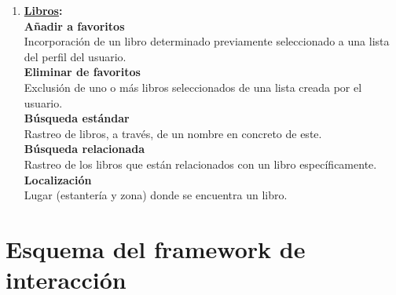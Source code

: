 \documentclass[12pt]{article}
\begin{document}
\begin{enumerate}
\item \textbf{\underline{Libros}:}\\
\textbf{Añadir a favoritos}\\
Incorporación de un libro determinado previamente seleccionado a una lista del perfil del usuario.\\
\textbf{Eliminar de favoritos}\\
Exclusión de uno o más libros seleccionados de una lista creada por el usuario.\\
\textbf{Búsqueda estándar}\\
Rastreo de libros, a través, de un nombre en concreto de este.\\
\textbf{Búsqueda relacionada}\\
Rastreo de los libros que están relacionados con un libro específicamente.\\
\textbf{Localización}\\
Lugar (estantería y zona) donde se encuentra un libro.

\end{enumerate}
\newpage
\section{Esquema del framework de interacción}
\end{document}
